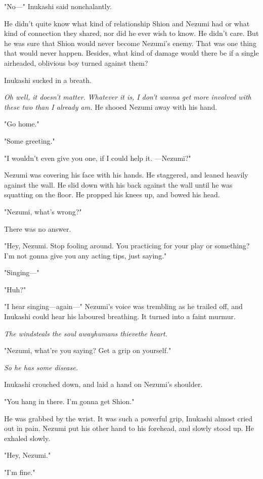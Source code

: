 "No---" Inukashi said nonchalantly.

He didn't quite know what kind of relationship Shion and Nezumi had or
what kind of connection they shared, nor did he ever wish to know. He
didn't care. But he was sure that Shion would never become Nezumi's
enemy. That was one thing that would never happen. Besides, what kind of
damage would there be if a single airheaded, oblivious boy turned
against them?

Inukashi sucked in a breath.

\emph{Oh well, it doesn't matter. Whatever it is, I don't wanna get more
involved with these two than I already am.} He shooed Nezumi away with
his hand.

"Go home."

"Some greeting."

"I wouldn't even give you one, if I could help it. ---Nezumi?"

Nezumi was covering his face with his hands. He staggered, and leaned
heavily against the wall. He slid down with his back against the wall
until he was squatting on the floor. He propped his knees up, and bowed
his head.

"Nezumi, what's wrong?"

There was no answer.

"Hey, Nezumi. Stop fooling around. You practicing for your play or
something? I'm not gonna give you any acting tips, just saying."

"Singing---"

"Huh?"

"I hear singing---again---" Nezumi's voice was trembling as he trailed off,
and Inukashi could hear his laboured breathing. It turned into a faint
murmur.

\emph{The wind\el steals the soul away\el humans thieve\el the heart.}

"Nezumi, what're you saying? Get a grip on yourself."

\emph{So he has some disease.}

Inukashi crouched down, and laid a hand on Nezumi's shoulder.

"You hang in there. I'm gonna get Shion."

He was grabbed by the wrist. It was such a powerful grip, Inukashi
almost cried out in pain. Nezumi put his other hand to his forehead, and
slowly stood up. He exhaled slowly.

"Hey, Nezumi."

"I'm fine."

